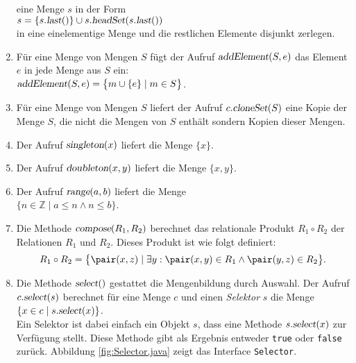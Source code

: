 \begin{enumerate}
      eine Menge $s$ in der Form
      \\[0.2cm]
      \hspace*{1.3cm}
      $s = \{ s.\textsl{last}() \} \cup s.\textsl{headSet}(s.\textsl{last}())$
      \\[0.2cm]
      in eine einelementige Menge und die restlichen Elemente disjunkt zerlegen.
\item F\"ur eine Menge von Mengen $S$ f\"ugt der Aufruf $\textsl{addElement}(S, e)$ das Element $e$ in jede Menge
      aus $S$ ein: 
      \\[0.2cm]
      \hspace*{1.3cm}
      $\textsl{addElement}(S,e) = \bigl\{ m \cup \{e\} \mid m \in S \bigr\}$.
\item F\"ur eine Menge von Mengen $S$ liefert der Aufruf $c.\textsl{cloneSet}(S)$
      eine Kopie der Menge $S$, die nicht die Mengen von $S$ enth\"alt sondern Kopien
      dieser Mengen.
\item Der Aufruf $\textsl{singleton}(x)$ liefert die Menge $\{x\}$.
\item Der Aufruf $\textsl{doubleton}(x,y)$ liefert die Menge $\{x,y\}$.
\item Der Aufruf $\textsl{range}(a,b)$ liefert die Menge 
      \\[0.2cm]
      \hspace*{1.3cm} $\{ n \in \mathbb{Z} \mid a \leq n \wedge n \leq b \}$.
\item Die Methode $\textsl{compose}(R_1, R_2)$ berechnet das relationale Produkt 
      $R_1 \circ R_2$ der Relationen $R_1$ und $R_2$.  Dieses Produkt ist wie folgt 
      definiert:
      \[ 
      R_1 \circ R_2 = \bigl\{ \pair(x,z) \mid \exists y : \pair(x,y) \in R_1 \wedge \pair(y,z) \in R_2 \bigl\}. 
      \]
\item Die Methode $\textsl{select}()$ gestattet die Mengenbildung durch Auswahl.
      Der Aufruf $c.\textsl{select}(s)$ berechnet f\"ur eine Menge $c$ und einen
      \emph{Selektor} $s$ die Menge 
      \\[0.2cm]
      \hspace*{1.3cm}
      $\{ x \in c \mid s.\textsl{select}(x) \}$.
      \\[0.2cm]
      Ein Selektor ist dabei einfach ein Objekt $s$, dass eine Methode
      $s.\textsl{select}(x)$ zur Verf\"ugung stellt.  Diese Methode gibt als Ergebnis 
      entweder \texttt{true} oder \texttt{false} zur\"uck.  Abbildung
      \ref{fig:Selector.java} zeigt das Interface \texttt{Selector}.


\end{enumerate}
